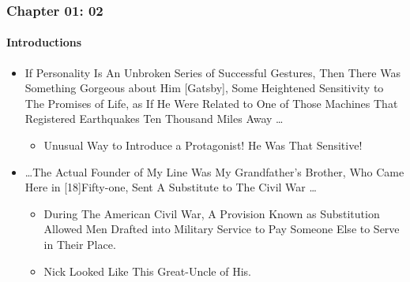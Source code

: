 \begin{frame}
\frametitle{Chapter 01: 02}
\framesubtitle{Introductions}
\label{slide:chapter-01-02}
\begin{itemize}
\item 
If Personality Is An Unbroken Series of Successful Gestures, Then There Was Something Gorgeous about Him [Gatsby], Some Heightened Sensitivity to The Promises of Life, as If He Were Related to One of Those Machines That Registered Earthquakes Ten Thousand Miles Away \dots
\begin{itemize}
\pause \item Unusual Way to Introduce a Protagonist! He Was \alert {That Sensitive}!
\end{itemize}
\pause
\item \dots The Actual Founder of My Line Was My Grandfather's Brother, Who Came Here in [18]Fifty-one, Sent A Substitute to The Civil War \dots
\begin{itemize}
\pause \item During The American Civil War, A Provision Known as \alert{Substitution Allowed Men Drafted into Military Service to Pay Someone Else to Serve in Their Place}.
\pause \item Nick Looked Like This Great-Uncle of His.
\end{itemize}
\end{itemize}
\end{frame}
